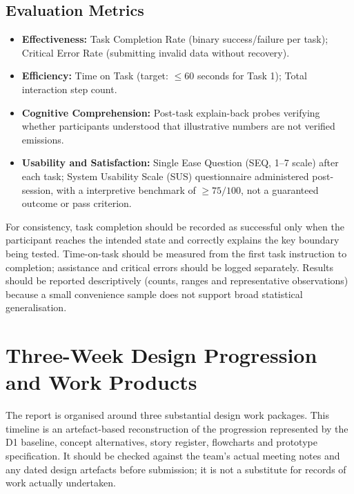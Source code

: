 \documentclass[12pt,a4paper]{article}
\begin{document}
\subsection{Evaluation Metrics}
\begin{itemize}[leftmargin=*]
  \item \textbf{Effectiveness:} Task Completion Rate (binary success/failure per task); Critical Error Rate (submitting invalid data without recovery).
  \item \textbf{Efficiency:} Time on Task (target: $\le 60$ seconds for Task 1); Total interaction step count.
  \item \textbf{Cognitive Comprehension:} Post-task explain-back probes verifying whether participants understood that illustrative numbers are not verified emissions.
  \item \textbf{Usability and Satisfaction:} Single Ease Question (SEQ, 1--7 scale) after each task; System Usability Scale (SUS) questionnaire administered post-session, with a interpretive benchmark of $\ge 75/100$, not a guaranteed outcome or pass criterion.
\end{itemize}

For consistency, task completion should be recorded as successful only when the participant reaches the intended state and correctly explains the key boundary being tested. Time-on-task should be measured from the first task instruction to completion; assistance and critical errors should be logged separately. Results should be reported descriptively (counts, ranges and representative observations) because a small convenience sample does not support broad statistical generalisation.

\section{Three-Week Design Progression and Work Products}

The report is organised around three substantial design work packages. This timeline is an artefact-based reconstruction of the progression represented by the D1 baseline, concept alternatives, story register, flowcharts and prototype specification. It should be checked against the team's actual meeting notes and any dated design artefacts before submission; it is not a substitute for records of work actually undertaken.
\end{document}
